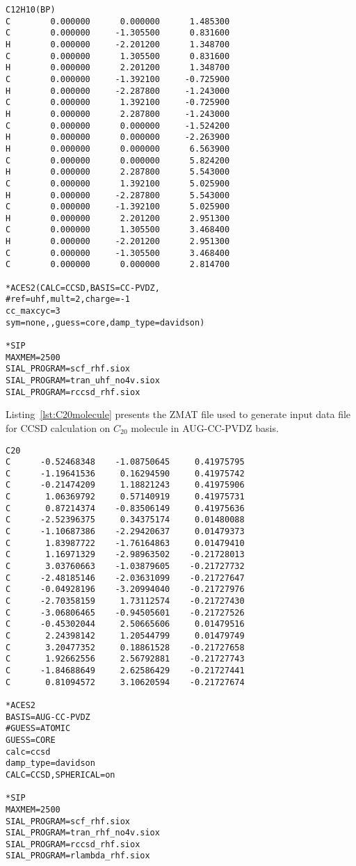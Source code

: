 \begin{lstlisting}[caption={ZMAT file for CCSD calculation on $C_{12}H_{10}$ molecule in CC-PVDZ basis.},
  label={lst:bpmolecule}]
C12H10(BP)
C        0.000000      0.000000      1.485300
C        0.000000     -1.305500      0.831600
H        0.000000     -2.201200      1.348700
C        0.000000      1.305500      0.831600
H        0.000000      2.201200      1.348700
C        0.000000     -1.392100     -0.725900
H        0.000000     -2.287800     -1.243000
C        0.000000      1.392100     -0.725900
H        0.000000      2.287800     -1.243000
C        0.000000      0.000000     -1.524200
H        0.000000      0.000000     -2.263900
H        0.000000      0.000000      6.563900
C        0.000000      0.000000      5.824200
H        0.000000      2.287800      5.543000
C        0.000000      1.392100      5.025900
H        0.000000     -2.287800      5.543000
C        0.000000     -1.392100      5.025900
H        0.000000      2.201200      2.951300
C        0.000000      1.305500      3.468400
H        0.000000     -2.201200      2.951300
C        0.000000     -1.305500      3.468400
C        0.000000      0.000000      2.814700

*ACES2(CALC=CCSD,BASIS=CC-PVDZ,
#ref=uhf,mult=2,charge=-1
cc_maxcyc=3
sym=none,,guess=core,damp_type=davidson)

*SIP
MAXMEM=2500
SIAL_PROGRAM=scf_rhf.siox
SIAL_PROGRAM=tran_uhf_no4v.siox
SIAL_PROGRAM=rccsd_rhf.siox
\end{lstlisting}

Listing~\ref{lst:C20molecule} presents the ZMAT file used to generate input data
file for CCSD calculation on $C_{20}$ molecule in AUG-CC-PVDZ basis.

\begin{lstlisting}[caption={ZMAT file for CCSD calculation on $C_{20}$ molecule in AUG-CC-PVDZ basis.},
  label={lst:C20molecule}]
C20
C      -0.52468348    -1.08750645     0.41975795
C      -1.19641536     0.16294590     0.41975742
C      -0.21474209     1.18821243     0.41975906
C       1.06369792     0.57140919     0.41975731
C       0.87214374    -0.83506149     0.41975636
C      -2.52396375     0.34375174     0.01480088
C      -1.10687386    -2.29420637     0.01479373
C       1.83987722    -1.76164863     0.01479410
C       1.16971329    -2.98963502    -0.21728013
C       3.03760663    -1.03879605    -0.21727732
C      -2.48185146    -2.03631099    -0.21727647
C      -0.04928196    -3.20994040    -0.21727976
C      -2.70358159     1.73112574    -0.21727430
C      -3.06806465    -0.94505601    -0.21727526
C      -0.45302044     2.50665606     0.01479516
C       2.24398142     1.20544799     0.01479749
C       3.20477352     0.18861528    -0.21727658
C       1.92662556     2.56792881    -0.21727743
C      -1.84688649     2.62586429    -0.21727441
C       0.81094572     3.10620594    -0.21727674

*ACES2
BASIS=AUG-CC-PVDZ
#GUESS=ATOMIC
GUESS=CORE
calc=ccsd
damp_type=davidson
CALC=CCSD,SPHERICAL=on

*SIP
MAXMEM=2500
SIAL_PROGRAM=scf_rhf.siox
SIAL_PROGRAM=tran_rhf_no4v.siox
SIAL_PROGRAM=rccsd_rhf.siox
SIAL_PROGRAM=rlambda_rhf.siox
\end{lstlisting}

